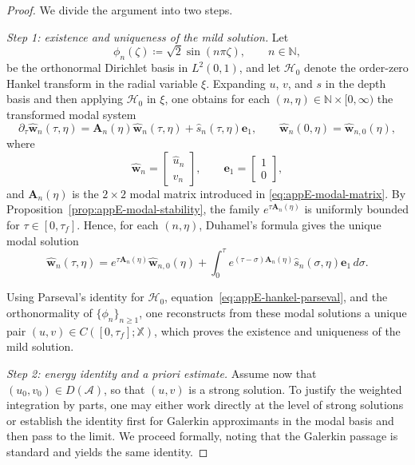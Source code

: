 \begin{proof}
    We divide the argument into two steps.

    \smallskip
    \noindent
    \textit{Step 1: existence and uniqueness of the mild solution.}
    Let
    \[
        \phi_n(\zeta) \coloneqq \sqrt{2}\sin(n\pi\zeta),
        \qquad n\in\mathbb{N},
    \]
    be the orthonormal Dirichlet basis in \(L^2(0,1)\), and let
    \(\mathscr H_0\) denote the order-zero Hankel transform in the radial
    variable \(\xi\). Expanding \(u\), \(v\), and \(s\) in the depth basis and
    then applying \(\mathscr H_0\) in \(\xi\), one obtains for each
    \((n,\eta)\in \mathbb{N}\times [0,\infty)\) the transformed modal system
    \[
        \partial_\tau \widehat{\mathbf w}_n(\tau,\eta)
        =
        \mathbf A_n(\eta)\widehat{\mathbf w}_n(\tau,\eta)
        +
        \widehat{s}_n(\tau,\eta)\mathbf e_1,
        \qquad
        \widehat{\mathbf w}_n(0,\eta)=\widehat{\mathbf w}_{n,0}(\eta),
    \]
    where
    \[
        \widehat{\mathbf w}_n
        =
        \begin{bmatrix}
            \widehat u_n \\[2pt]
            \widehat v_n
        \end{bmatrix},
        \qquad
        \mathbf e_1=
        \begin{bmatrix}
            1 \\[2pt]
            0
        \end{bmatrix},
    \]
    and \(\mathbf A_n(\eta)\) is the \(2\times 2\) modal matrix introduced in
    \eqref{eq:appE-modal-matrix}. By
    Proposition~\ref{prop:appE-modal-stability}, the family
    \(e^{\tau \mathbf A_n(\eta)}\) is uniformly bounded for
    \(\tau\in[0,\tau_f]\). Hence, for each \((n,\eta)\), Duhamel's formula gives
    the unique modal solution
    \[
        \widehat{\mathbf w}_n(\tau,\eta)
        =
        e^{\tau \mathbf A_n(\eta)}\widehat{\mathbf w}_{n,0}(\eta)
        +
        \int_0^\tau
        e^{(\tau-\sigma)\mathbf A_n(\eta)}
        \widehat{s}_n(\sigma,\eta)\mathbf e_1\, d\sigma.
    \]

    Using Parseval's identity for \(\mathscr H_0\),
    equation~\eqref{eq:appE-hankel-parseval}, and the orthonormality of
    \(\{\phi_n\}_{n\ge 1}\), one reconstructs from these modal solutions a unique
    pair $(u,v)\in C([0,\tau_f];\mathbb X)$, which proves the existence and uniqueness of the mild solution.

    \smallskip
    \noindent
    \textit{Step 2: energy identity and a priori estimate.}
    Assume now that \((u_0,v_0)\in D(\mathcal A)\), so that \((u,v)\) is a strong
    solution. To justify the weighted integration by parts, one may
    either work directly at the level of strong solutions or
    establish the identity first for Galerkin approximants in the modal basis and
    then pass to the limit. We proceed formally, noting that the Galerkin passage
    is standard and yields the same identity.


\end{proof}
